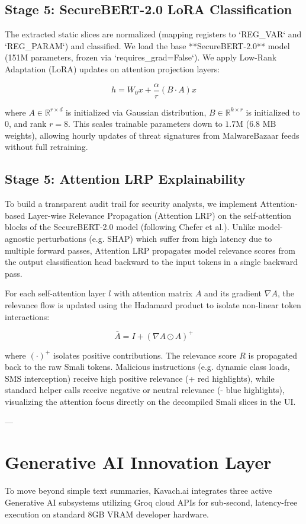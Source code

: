 \documentclass[conference]{IEEEtran}
\begin{document}
\subsection{Stage 5: SecureBERT-2.0 LoRA Classification}
The extracted static slices are normalized (mapping registers to `REG_VAR` and `REG_PARAM`) and classified. We load the base **SecureBERT-2.0** model (151M parameters, frozen via `requires_grad=False`). We apply Low-Rank Adaptation (LoRA) updates on attention projection layers:

$$h = W_0 x + \frac{\alpha}{r} (B \cdot A) x$$

where $A \in \mathbb{R}^{r \times d}$ is initialized via Gaussian distribution, $B \in \mathbb{R}^{k \times r}$ is initialized to $0$, and rank $r=8$. This scales trainable parameters down to $1.7\text{M}$ ($6.8\text{ MB}$ weights), allowing hourly updates of threat signatures from MalwareBazaar feeds without full retraining.

\subsection{Stage 5: Attention LRP Explainability}
To build a transparent audit trail for security analysts, we implement Attention-based Layer-wise Relevance Propagation (Attention LRP) on the self-attention blocks of the SecureBERT-2.0 model (following Chefer et al.). Unlike model-agnostic perturbations (e.g. SHAP) which suffer from high latency due to multiple forward passes, Attention LRP propagates model relevance scores from the output classification head backward to the input tokens in a single backward pass. 

For each self-attention layer $l$ with attention matrix $A$ and its gradient $\nabla A$, the relevance flow is updated using the Hadamard product to isolate non-linear token interactions:

$$\bar{A} = I + (\nabla A \odot A)^+$$

where $( \cdot )^+$ isolates positive contributions. The relevance score $R$ is propagated back to the raw Smali tokens. Malicious instructions (e.g. dynamic class loads, SMS interception) receive high positive relevance (+ red highlights), while standard helper calls receive negative or neutral relevance (- blue highlights), visualizing the attention focus directly on the decompiled Smali slices in the UI.

---

\section{Generative AI Innovation Layer}
To move beyond simple text summaries, Kavach.ai integrates three active Generative AI subsystems utilizing Groq cloud APIs for sub-second, latency-free execution on standard 8GB VRAM developer hardware.
\end{document}
